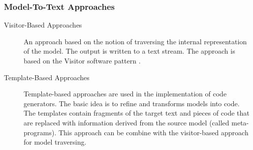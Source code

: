 \subsubsection{Model-To-Text Approaches}
\begin{description}
\item[Visitor-Based Approaches]
An approach based on the notion of traversing the internal representation of the model. The output is written to a text stream. The approach is based on the Visitor software pattern \cite{gamma1994design}. 
\item[Template-Based Approaches]
Template-based approaches are used in the implementation of code generators. The basic idea is to refine and transforms models into code. The templates contain fragments of the target text and pieces of code that are replaced with information derived from the source model (called meta-programs). This approach can be combine with the visitor-based approach for model traversing. 
\end{description}

